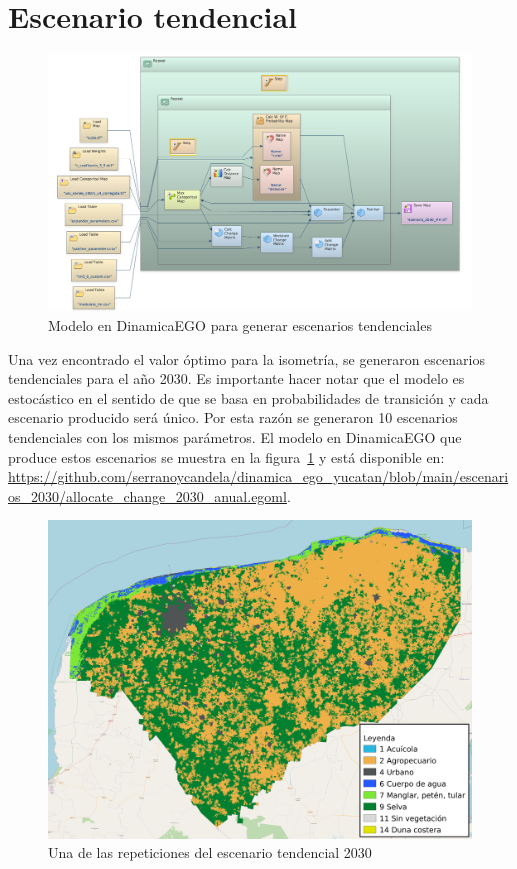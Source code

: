 \documentclass[12pt,a4paper,oldfontcommands]{article}
\begin{document}
\section{Escenario tendencial}
\begin{figure}[H]
	\centering
	\includegraphics[width=1\textwidth]{./figuras/modelo_escenarios.png}
	\caption{Modelo en DinamicaEGO para generar escenarios tendenciales}
	\label{fig:modelo_escenarios}
\end{figure}
Una vez encontrado el valor óptimo para la isometría, se generaron escenarios tendenciales para el año 2030. Es importante hacer notar que el modelo es estocástico en el sentido de que se basa en probabilidades de transición y cada escenario producido será único. Por esta razón se generaron 10 escenarios tendenciales con los mismos parámetros. El modelo en DinamicaEGO que produce estos escenarios se muestra en la figura~\ref{fig:modelo_escenarios} y está disponible en: \url{https://github.com/serranoycandela/dinamica_ego_yucatan/blob/main/escenarios_2030/allocate_change_2030_anual.egoml}.

\begin{figure}[H]
	\centering
	\includegraphics[width=1\textwidth]{./figuras/escenario_2030.png}
	\caption{Una de las repeticiones del escenario tendencial 2030}
	\label{fig:escenario_2030}
\end{figure}
\end{document}
